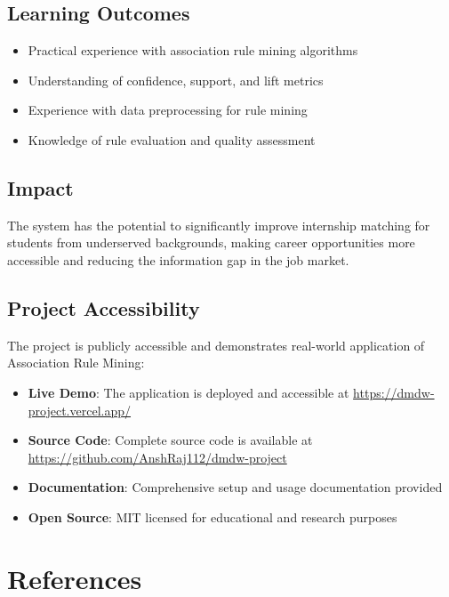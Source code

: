 \documentclass[12pt,a4paper]{article}
\begin{document}
\subsection{Learning Outcomes}
\begin{itemize}
    \item Practical experience with association rule mining algorithms
    \item Understanding of confidence, support, and lift metrics
    \item Experience with data preprocessing for rule mining
    \item Knowledge of rule evaluation and quality assessment
\end{itemize}

\subsection{Impact}
The system has the potential to significantly improve internship matching for students from underserved backgrounds, making career opportunities more accessible and reducing the information gap in the job market.

\subsection{Project Accessibility}
The project is publicly accessible and demonstrates real-world application of Association Rule Mining:

\begin{itemize}
    \item \textbf{Live Demo}: The application is deployed and accessible at \url{https://dmdw-project.vercel.app/}
    \item \textbf{Source Code}: Complete source code is available at \url{https://github.com/AnshRaj112/dmdw-project}
    \item \textbf{Documentation}: Comprehensive setup and usage documentation provided
    \item \textbf{Open Source}: MIT licensed for educational and research purposes
\end{itemize}

\section{References}
\end{document}
